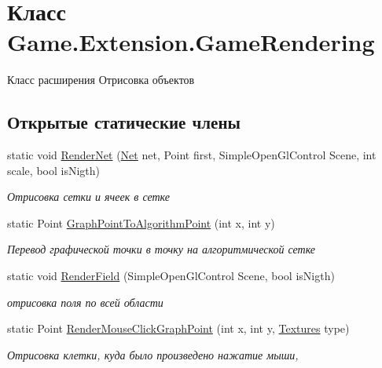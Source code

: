 \hypertarget{class_game_1_1_extension_1_1_game_rendering}{}\section{Класс Game.\+Extension.\+Game\+Rendering}
\label{class_game_1_1_extension_1_1_game_rendering}


Класс расширения Отрисовка объектов  


\subsection*{Открытые статические члены}
\begin{DoxyCompactItemize}
\item 
static void \hyperlink{class_game_1_1_extension_1_1_game_rendering_ab6e8f4d36817459fcb0ee25974c954e8}{Render\+Net} (\hyperlink{class_game_1_1_models_1_1_net}{Net} net, Point first, Simple\+Open\+Gl\+Control Scene, int scale, bool is\+Nigth)
\begin{DoxyCompactList}\small\item\em Отрисовка сетки и ячеек в сетке \end{DoxyCompactList}\item 
static Point \hyperlink{class_game_1_1_extension_1_1_game_rendering_a07669ea2f3fdcc43890d18f79e822c3d}{Graph\+Point\+To\+Algorithm\+Point} (int x, int y)
\begin{DoxyCompactList}\small\item\em Перевод графической точки в точку на алгоритмической сетке \end{DoxyCompactList}\item 
static void \hyperlink{class_game_1_1_extension_1_1_game_rendering_a6ec1beb15590737b78445a193025850b}{Render\+Field} (Simple\+Open\+Gl\+Control Scene, bool is\+Nigth)
\begin{DoxyCompactList}\small\item\em отрисовка поля по всей области \end{DoxyCompactList}\item 
static Point \hyperlink{class_game_1_1_extension_1_1_game_rendering_af6e48165a35d51a6eb41bc4d0ca42843}{Render\+Mouse\+Click\+Graph\+Point} (int x, int y, \hyperlink{namespace_game_1_1_enums_a2d1ea7762a7b4609383b4b578d1c4a60}{Textures} type)
\begin{DoxyCompactList}\small\item\em Отрисовка клетки, куда было произведено нажатие мыши, \end{DoxyCompactList}\item 

\end{DoxyCompactItemize}
